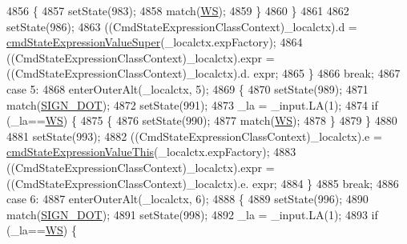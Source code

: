 \begin{DoxyCode}
4856           \{
4857           setState(983);
4858           match(\hyperlink{classgov_1_1nasa_1_1jpf_1_1inspector_1_1server_1_1expression_1_1parser_1_1_expression_grammar_parser_ace44714ae633c7b14794cc5a24d9ebf3}{WS});
4859           \}
4860         \}
4861 
4862         setState(986);
4863         ((CmdStateExpressionClassContext)\_localctx).d = 
      \hyperlink{classgov_1_1nasa_1_1jpf_1_1inspector_1_1server_1_1expression_1_1parser_1_1_expression_grammar_parser_ae563e67295fa935ca387e0ff9ec0d599}{cmdStateExpressionValueSuper}(\_localctx.expFactory);
4864          ((CmdStateExpressionClassContext)\_localctx).expr =  ((CmdStateExpressionClassContext)\_localctx).d.
      expr; 
4865         \}
4866         \textcolor{keywordflow}{break};
4867       \textcolor{keywordflow}{case} 5:
4868         enterOuterAlt(\_localctx, 5);
4869         \{
4870         setState(989);
4871         match(\hyperlink{classgov_1_1nasa_1_1jpf_1_1inspector_1_1server_1_1expression_1_1parser_1_1_expression_grammar_parser_af578d1cac8553bcf6f52608a4e9125f1}{SIGN\_DOT});
4872         setState(991);
4873         \_la = \_input.LA(1);
4874         \textcolor{keywordflow}{if} (\_la==\hyperlink{classgov_1_1nasa_1_1jpf_1_1inspector_1_1server_1_1expression_1_1parser_1_1_expression_grammar_parser_ace44714ae633c7b14794cc5a24d9ebf3}{WS}) \{
4875           \{
4876           setState(990);
4877           match(\hyperlink{classgov_1_1nasa_1_1jpf_1_1inspector_1_1server_1_1expression_1_1parser_1_1_expression_grammar_parser_ace44714ae633c7b14794cc5a24d9ebf3}{WS});
4878           \}
4879         \}
4880 
4881         setState(993);
4882         ((CmdStateExpressionClassContext)\_localctx).e = 
      \hyperlink{classgov_1_1nasa_1_1jpf_1_1inspector_1_1server_1_1expression_1_1parser_1_1_expression_grammar_parser_accf212342e54a654e9832816edfce8e4}{cmdStateExpressionValueThis}(\_localctx.expFactory);
4883          ((CmdStateExpressionClassContext)\_localctx).expr =  ((CmdStateExpressionClassContext)\_localctx).e.
      expr; 
4884         \}
4885         \textcolor{keywordflow}{break};
4886       \textcolor{keywordflow}{case} 6:
4887         enterOuterAlt(\_localctx, 6);
4888         \{
4889         setState(996);
4890         match(\hyperlink{classgov_1_1nasa_1_1jpf_1_1inspector_1_1server_1_1expression_1_1parser_1_1_expression_grammar_parser_af578d1cac8553bcf6f52608a4e9125f1}{SIGN\_DOT});
4891         setState(998);
4892         \_la = \_input.LA(1);
4893         \textcolor{keywordflow}{if} (\_la==\hyperlink{classgov_1_1nasa_1_1jpf_1_1inspector_1_1server_1_1expression_1_1parser_1_1_expression_grammar_parser_ace44714ae633c7b14794cc5a24d9ebf3}{WS}) \{

\end{DoxyCode}
